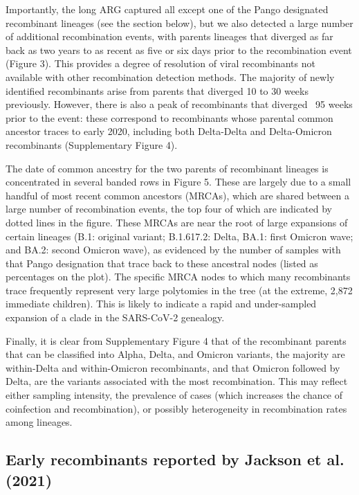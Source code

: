 \documentclass{article}
\begin{document}
Importantly, the long ARG captured all except one of the Pango designated recombinant lineages (see the section below), but we also detected a large number of additional recombination events, with parents lineages that diverged as far back as two years to as recent as five or six days prior to the recombination event (Figure 3). This provides a degree of resolution of viral recombinants not available with other recombination detection methods. The majority of newly identified recombinants arise from parents that diverged 10 to 30 weeks previously. However, there is also a peak of recombinants that diverged ~95 weeks prior to the event: these correspond to recombinants whose parental common ancestor traces to early 2020, including both Delta-Delta and Delta-Omicron recombinants (Supplementary Figure 4).

The date of common ancestry for the two parents of recombinant lineages is concentrated in several banded rows in Figure 5. These are largely due to a small handful of most recent common ancestors (MRCAs), which are shared between a large number of recombination events, the top four of which are indicated by dotted lines in the figure. These MRCAs are near the root of large expansions of certain lineages (B.1: original variant;  B.1.617.2: Delta, BA.1: first Omicron wave; and BA.2: second Omicron wave), as evidenced by the number of samples with that Pango designation that trace back to these ancestral nodes (listed as percentages on the plot). The specific MRCA nodes to which many recombinants trace frequently represent very large polytomies in the tree (at the extreme, 2,872 immediate children). This is likely to indicate a rapid and under-sampled expansion of a clade in the SARS-CoV-2 genealogy.

Finally, it is clear from Supplementary Figure 4 that of the recombinant parents that can be classified into Alpha, Delta, and Omicron variants, the majority are within-Delta and within-Omicron recombinants, and that Omicron followed by Delta, are the variants associated with the most recombination. This may reflect either sampling intensity, the prevalence of cases (which increases the chance of coinfection and recombination), or possibly heterogeneity in recombination rates among lineages.

\subsection{Early recombinants reported by Jackson et al. (2021)}
\end{document}
